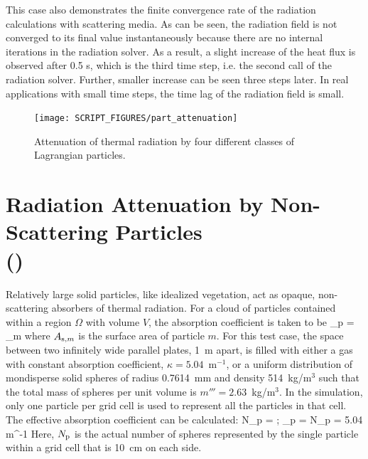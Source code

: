\documentclass[11pt]{book}
\begin{document}
This case also demonstrates the finite convergence rate of the radiation calculations with scattering media. As can be seen, the radiation field is not converged to its final value instantaneously because there are no internal iterations in the radiation solver. As a result, a slight increase of the heat flux is observed after 0.5 s, which is the third time step, i.e. the second call of the radiation solver. Further, smaller increase can be seen three steps later. In real applications with small time steps, the time lag of the radiation field is small.

\begin{figure}[h]
\centering
\texttt{[image: SCRIPT\_FIGURES/part\_attenuation]}
\caption[Radiation attenuation by Lagrangian particles]{Attenuation of thermal radiation by four different classes of Lagrangian particles.}
\label{part_attenuation_figure}
\end{figure}


\section{Radiation Attenuation by Non-Scattering Particles \\ (\texorpdfstring{}{radiation\_gas-veg\_consistency})}
\label{radiation_gas-veg_consistency}
\label{radiation_gas-veg_consistency_gas}
\label{radiation_gas-veg_consistency_veg}

Relatively large solid particles, like idealized vegetation, act as opaque, non-scattering absorbers of thermal radiation. For a cloud of particles contained within a region $\Omega$ with volume $V$, the absorption coefficient is taken to be
\be
   \kappa_{\rm p} = \sum_{m \in \Omega} 
\ee
where $A_{{\rm s},m}$ is the surface area of particle $m$. For this test case, the space between two infinitely wide parallel plates, 1~m apart, is filled with either a gas with constant absorption coefficient, $\kappa=5.04$~m$^{-1}$, or a uniform distribution of mondisperse solid spheres of radius 0.7614~mm and density 514~kg/m$^3$ such that the total mass of spheres per unit volume is $m'''=2.63$~kg/m$^3$. In the simulation, only one particle per grid cell is used to represent all the particles in that cell. The effective absorption coefficient can be calculated:
\be
   N_{\rm p} =  \quad ; \quad \kappa_{\rm p} = N_{\rm p}  = 5.04 \; \hbox{m}^{-1}
\ee
Here, $N_{\rm p}$ is the actual number of spheres represented by the single particle within a grid cell that is 10~cm on each side.
\end{document}
